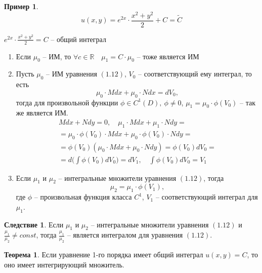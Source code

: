 \documentclass{report}
\theoremstyle{definition}
\newtheorem{example}{Пример}
\newtheorem*{effect}{Следствие}
\newtheorem{theorem}{Теорема}[section]
\begin{document}
\begin{example}
    \begin{equation*}
        u(x,y) = e^{2x} \cdot \frac{x^2 + y^2}{2} + C = \widetilde{C}
    \end{equation*}
    \begin{center}
        $e^{2x} \cdot \frac{x^2 + y^2}{2} = C$ -- общий интеграл
    \end{center}
    \begin{enumerate}
        \item Если $\mu_0$ -- ИМ, то $\forall c \in \mathbb{R} \quad \mu_1 = C \cdot \mu_0$ -- тоже является ИМ
        \item Пусть $\mu_0$ -- ИМ уравнения $(1.12)$, $V_0$ -- соответствующий ему интеграл, то есть
              \begin{equation*}
                  \mu_0 \cdot Mdx + \mu_0 \cdot N dx = d V_0,
              \end{equation*}
              тогда для произвольной функции $\phi \in C^1(D), \ \phi \ne 0$, $\mu_1 = \mu_0 \cdot \phi(V_0)$ -- так же является ИМ.
              \begin{multline*}
                  Mdx + Ndy = 0, \quad \mu_1 \cdot Mdx + \mu_1 \cdot N dy = \\
                  = \mu_0 \cdot \phi(V_0)\cdot Mdx + \mu_0 \cdot \phi(V_0)\cdot Ndy = \\
                  = \phi(V_0)(\mu_0 \cdot Mdx + \mu_0 \cdot N dy) = \phi(V_0)dV_0 = \\
                  = d\bigg(\int \phi(V_0)dV_0\bigg) = dV_1, \quad \int \phi(V_0)dV_0 = V_1
              \end{multline*}
        \item Если $\mu_1$ и $\mu_2$ -- интегральные множители уравнения $(1.12)$, тогда
              \begin{equation*}
                  \mu_2 = \mu_1 \cdot \phi(V_1),
              \end{equation*}
              где $\phi$ -- произвольная функция класса $C^1$, $V_1$ -- соответствующий интеграл для $\mu_1$.
    \end{enumerate}
\end{example}

\begin{effect}
    Если $\mu_1$ и $\mu_2$ -- интегральные множители уравнения $(1.12)$ и $\frac{\mu_1}{\mu_2} \ne const$, тогда $\frac{\mu_1}{\mu_2}$ -- является интегралом для уравнения $(1.12)$.
\end{effect}

\begin{theorem}
    Если уравнение 1-го порядка имеет общий интеграл $u(x,y) = C$, то оно имеет интегрирующий множитель.
\end{theorem}
\end{document}
